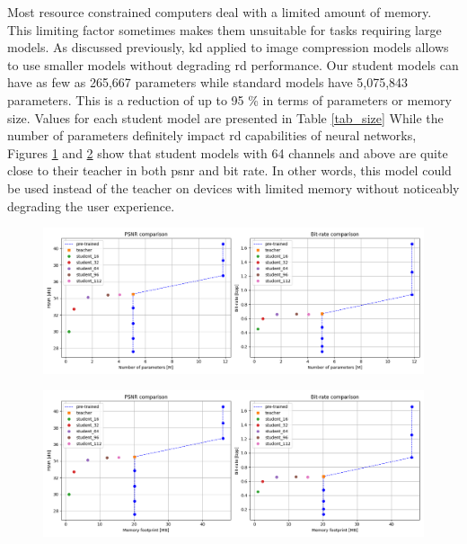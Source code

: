 Most resource constrained computers deal with a limited amount of memory. This limiting factor sometimes makes them unsuitable for tasks requiring large models. As discussed previously, \acrshort{kd} applied to image compression models allows to use smaller models without degrading \acrshort{rd} performance. Our student models can have as few as 265,667 parameters while standard models have 5,075,843 parameters. This is a reduction of up to 95 \% in terms of parameters or memory size. Values for each student model are presented in Table \ref{tab_size} While the number of parameters definitely impact \acrshort{rd} capabilities of neural networks, Figures \ref{kd_lic_parameters} and \ref{kd_lic_memory} show that student models with 64 channels and above are quite close to their teacher in both \acrshort{psnr} and bit rate. In other words, this model could be used instead of the teacher on devices with limited memory without noticeably degrading the user experience.

\begin{figure}
    \centering
    \includegraphics[width=15cm]{img/kd_lic_parameters.png}
    \caption[]{}
    \label{kd_lic_parameters}
\end{figure}

\begin{figure}
    \centering
    \includegraphics[width=15cm]{img/kd_lic_memory.png}
    \caption[]{}
    \label{kd_lic_memory}
\end{figure}

